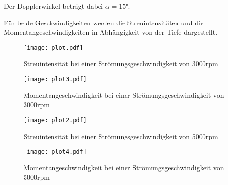 Der Dopplerwinkel beträgt dabei $\alpha=15°$.

Für beide Geschwindigkeiten werden die Streuintensitäten und die Momentangeschwindigkeiten in Abhängigkeit von der Tiefe dargestellt.


\begin{figure}
  \centering
  \texttt{[image: plot.pdf]}
  \caption{Streuintensität bei einer Strömungsgeschwindigkeit von 3000rpm}
  \label{fig:plot}
\end{figure}

\begin{figure}
  \centering
  \texttt{[image: plot3.pdf]}
  \caption{Momentangeschwindigkeit bei einer Strömungsgeschwindigkeit von 3000rpm}
  \label{fig:plot}
\end{figure}


\begin{figure}
  \centering
  \texttt{[image: plot2.pdf]}
  \caption{Streuintensität bei einer Strömungsgeschwindigkeit von 5000rpm}
  \label{fig:plot}
\end{figure}

\begin{figure}
  \centering
  \texttt{[image: plot4.pdf]}
  \caption{Momentangeschwindigkeit bei einer Strömungsgeschwindigkeit von 5000rpm}
  \label{fig:plot}
\end{figure}
